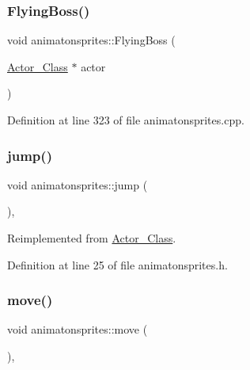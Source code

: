 \subsubsection{\texorpdfstring{Flying\+Boss()}{FlyingBoss()}}
{\footnotesize\ttfamily void animatonsprites\+::\+Flying\+Boss (\begin{DoxyParamCaption}\item[{\hyperlink{class_actor___class}{Actor\+\_\+\+Class} $\ast$}]{actor }\end{DoxyParamCaption})}



Definition at line 323 of file animatonsprites.\+cpp.

\hypertarget{classanimatonsprites_a45b6be4805c6e25497956b88c176f552}{}\label{classanimatonsprites_a45b6be4805c6e25497956b88c176f552} 
\subsubsection{\texorpdfstring{jump()}{jump()}}
{\footnotesize\ttfamily void animatonsprites\+::jump (\begin{DoxyParamCaption}{ }\end{DoxyParamCaption})\hspace{0.3cm}{\ttfamily [inline]}, {\ttfamily [virtual]}}



Reimplemented from \hyperlink{class_actor___class_ab33216a3ce0c856bdc16231c71ae35c2}{Actor\+\_\+\+Class}.



Definition at line 25 of file animatonsprites.\+h.

\hypertarget{classanimatonsprites_a1cf7f2fb8b5a3299b05052c8b6328f01}{}\label{classanimatonsprites_a1cf7f2fb8b5a3299b05052c8b6328f01} 
\subsubsection{\texorpdfstring{move()}{move()}}
{\footnotesize\ttfamily void animatonsprites\+::move (\begin{DoxyParamCaption}{ }\end{DoxyParamCaption})\hspace{0.3cm}{\ttfamily [inline]}, {\ttfamily [virtual]}}



